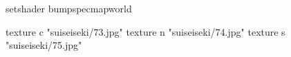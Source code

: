 setshader bumpspecmapworld

    texture c "suiseiseki/73.jpg"
    texture n "suiseiseki/74.jpg"
    texture s "suiseiseki/75.jpg"
